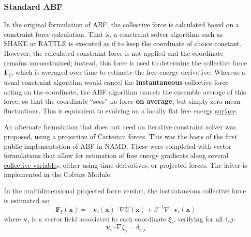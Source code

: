 \documentclass[9pt,review]{livecoms}
\newcommand{\vx}{\mathbf{x}}
\newcommand{\vF}{\mathbf{F}}
\newcommand{\vv}{\mathbf{v}}
\begin{document}
\subsubsection{Standard ABF}
\label{sec:ABF_standard}
In the original formulation of ABF\cite{Darve2000, Darve2001, Darve2002}, the collective force is calculated based on a constraint force calculation. That is, a constraint solver algorithm such as SHAKE or RATTLE\cite{Ryckaert1977,Andersen1983} is executed as if to keep the coordinate of choice constant.
However, the calculated constraint force is not applied and the coordinate remains unconstrained; instead, this force is used to determine the collective force $\vF_\xi$, which is averaged over time to estimate the free energy derivative.\cite{Darve2001}
Whereas a usual constraint algorithm would cancel the \textbf{instantaneous} collective force acting on the coordinate, the ABF algorithm cancels the ensemble average of this force, so that the coordinate ``sees'' no force \textbf{on average}, but simply zero-mean fluctuations. This is equivalent to evolving on a locally flat free energy \hyperlink{ref:FES} {surface}.


An alternate formulation that does not need an iterative constraint solver was proposed,\cite{Henin2004} using a projection of Cartesian forces.\cite{denOtter2000} This was the basis of the first public implementation of ABF in NAMD.
These were completed with vector formulations that allow for estimation of free energy gradients along several \hyperlink{ref:CV} {collective variable}s, either using time derivatives\cite{Darve2008}, or projected forces.\cite{Henin2010a}
The latter is implemented in the Colvars Module.\cite{Fiorin2013}

In the multidimensional projected force version,\cite{Henin2010a} the instantaneous collective force is estimated as:\cite{Ciccotti2005}
\begin{equation}
\vF_\xi(\vx) = - \vv_i(\vx) \cdot \nabla U(\vx) + \beta^{-1} \nabla \cdot \vv_i(\vx)
\end{equation}
where $\vv_i$ is a vector field associated to each coordinate $\xi_i$, verifying for all $i,j$:
\begin{equation}
    \vv_i \cdot \nabla \xi_j = \delta_{i,j}
\end{equation}

\end{document}
